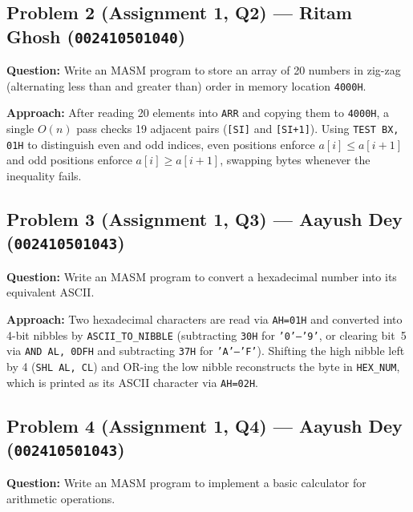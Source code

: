 \documentclass[11pt,a4paper]{article}
\begin{document}
\subsection{Problem 2 (Assignment 1, Q2) --- Ritam Ghosh (\texttt{002410501040})}

\textbf{Question:} Write an MASM program to store an array of 20 numbers in zig-zag (alternating less than and greater than) order in memory location \texttt{4000H}.

\textbf{Approach:} After reading 20 elements into \texttt{ARR} and copying them to \texttt{4000H}, a single $O(n)$ pass checks 19 adjacent pairs (\texttt{[SI]} and \texttt{[SI+1]}). Using \texttt{TEST BX, 01H} to distinguish even and odd indices, even positions enforce $a[i] \le a[i+1]$ and odd positions enforce $a[i] \ge a[i+1]$, swapping bytes whenever the inequality fails.



\subsection{Problem 3 (Assignment 1, Q3) --- Aayush Dey (\texttt{002410501043})}

\textbf{Question:} Write an MASM program to convert a hexadecimal number into its equivalent ASCII.

\textbf{Approach:} Two hexadecimal characters are read via \texttt{AH=01H} and converted into 4-bit nibbles by \texttt{ASCII\_TO\_NIBBLE} (subtracting \texttt{30H} for \texttt{'0'--'9'}, or clearing bit~5 via \texttt{AND AL, 0DFH} and subtracting \texttt{37H} for \texttt{'A'--'F'}). Shifting the high nibble left by 4 (\texttt{SHL AL, CL}) and OR-ing the low nibble reconstructs the byte in \texttt{HEX\_NUM}, which is printed as its ASCII character via \texttt{AH=02H}.



\subsection{Problem 4 (Assignment 1, Q4) --- Aayush Dey (\texttt{002410501043})}

\textbf{Question:} Write an MASM program to implement a basic calculator for arithmetic operations.
\end{document}

